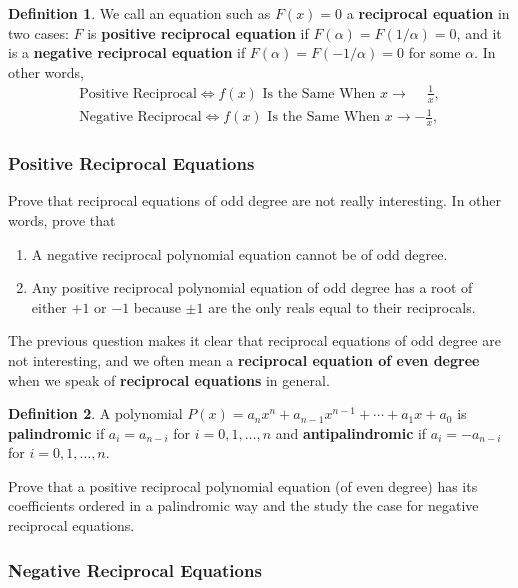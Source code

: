 \documentclass[12pt,a4paper]{memoir}
\theoremstyle{definition}
\newtheorem*{definition}{Definition}
\begin{document}
\begin{definition}
	We call an equation such as $F(x)=0$ a \textbf{reciprocal equation} in two cases: $F$ is \textbf{positive reciprocal equation} if $F(\alpha)=F(1/\alpha)=0$, and it is a \textbf{negative reciprocal equation} if $F(\alpha)=F(-1/\alpha)=0$ for some $\alpha$. In other words,
	\begin{align*}
		\text{Positive Reciprocal} \iff f(x) \text{ Is the Same When } x \to \phantom{-}\frac{1}{x},\\ \text{Negative Reciprocal}\iff f(x) \text{ Is the Same When } x \to -\frac{1}{x},
	\end{align*}
\end{definition}



\subsubsection{Positive Reciprocal Equations}

	\begin{question}
		Prove that reciprocal equations of odd degree are not really interesting. In other words, prove that
		\begin{enumerate}
			\item A negative reciprocal polynomial equation cannot be of odd degree.
			\item Any positive reciprocal polynomial equation of odd degree has a root of either $+1$ or $-1$ because $\pm 1$ are the only reals equal to their reciprocals.
		\end{enumerate}
	\end{question}
	The previous question makes it clear that reciprocal equations of odd degree are not interesting, and we often mean a \textbf{reciprocal equation of even degree} when we speak of \textbf{reciprocal equations} in general.
	\begin{definition}
		A polynomial $P(x)=a_nx^n+a_{n-1}x^{n-1}+\cdots+a_1x+a_0$ is \textbf{palindromic} if $a_i = a_{n-i}$ for $i = 0, 1, \dots, n$ and \textbf{antipalindromic} if $a_i = -a_{n-i}$ for $i = 0, 1, \dots, n$.
	\end{definition}
	\begin{question}
		Prove that a positive reciprocal polynomial equation (of even degree) has its coefficients ordered in a palindromic way and the study the case for negative reciprocal equations.
	\end{question}

\subsubsection{Negative Reciprocal Equations}
\end{document}
